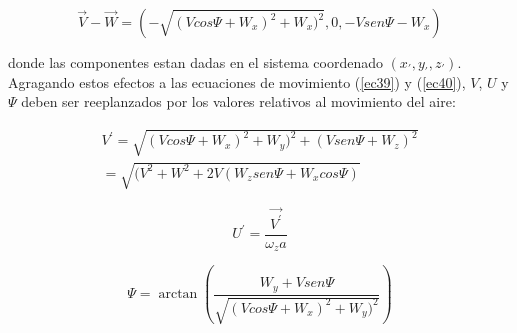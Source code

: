     	\begin{equation}
		\vec{V} - \vec{W} = (-\sqrt{(Vcos{\Psi}+W_{x})^{2}+W_{x})^{2}},0,-Vsen{\Psi}-W_{x})
		\label{ec56}
		\end{equation}

	donde las componentes estan dadas en el sistema coordenado $(x_{\prime},y_{\prime},z_{\prime})$. Agragando estos efectos a las ecuaciones de movimiento (\ref{ec39}) y (\ref{ec40}), $V$, $U$ y $\Psi$ deben ser reeplanzados por los valores relativos al movimiento del aire:

		\begin{subequations}
    	\begin{align}
		{V^{\prime}} = \sqrt{(Vcos{\Psi}+W_{x})^{2} + W_{y})^{2} + (Vsen{\Psi}+W_{z})^{2}}\\
	    = \sqrt{(V^{2} + W^{2} + 2V(W_{z}sen{\Psi} + W_{x}cos{\Psi})}
		\end{align}
		\label{ec57}
		\end{subequations}

    	\begin{equation}
		U^{\prime} = \frac{\vec{V^{\prime}}}{\omega_{z}a}
		\label{ec58}
		\end{equation}

		\begin{equation}
		{\Psi} = \arctan(\frac{W_{y}+Vsen{\Psi}}{\sqrt{(Vcos{\Psi}+W_{x})^{2} + W_{y})^{2}}})
		\label{ec59}
		\end{equation}
